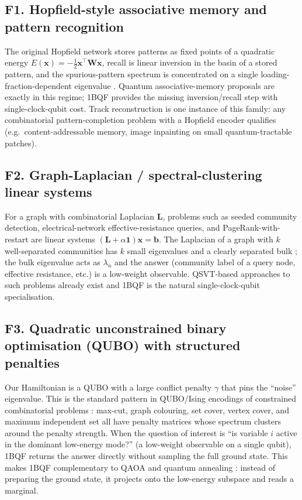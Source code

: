 \documentclass[11pt,a4paper]{article}
\newcommand{\OBQF}{\textsc{1BQF}}
\begin{document}
\subsection*{F1. Hopfield-style associative memory and pattern recognition}
The original Hopfield network \cite{Hopfield:1982} stores patterns as
fixed points of a quadratic energy
$E(\mathbf{x}) = -\tfrac12 \mathbf{x}^\top \mathbf{W}\mathbf{x}$, recall is
linear inversion in the basin of a stored pattern, and the
spurious-pattern spectrum is concentrated on a single
loading-fraction-dependent eigenvalue \cite{Amit:1985}.  Quantum
associative-memory proposals \cite{Ventura:2000,Trugenberger:2001} are
exactly in this regime; \OBQF{} provides the missing
inversion/recall step with single-clock-qubit cost.  Track
reconstruction is one instance of this family: any combinatorial
pattern-completion problem with a Hopfield encoder qualifies (e.g.\
content-addressable memory, image inpainting on small
quantum-tractable patches).

\subsection*{F2. Graph-Laplacian / spectral-clustering linear systems}
For a graph with combinatorial Laplacian $\mathbf{L}$, problems such as
seeded community detection, electrical-network effective-resistance
queries, and PageRank-with-restart are linear systems
$(\mathbf{L} + \alpha\mathbf{1})\mathbf{x} = \mathbf{b}$.  The Laplacian
of a graph with $k$ well-separated communities has $k$ small
eigenvalues and a clearly separated bulk \cite{vonLuxburg:2007}; the
bulk eigenvalue acts as $\lambda_n$ and the answer (community label of
a query node, effective resistance, etc.) is a low-weight observable.
QSVT-based approaches to such problems already exist
\cite{Apers:2022,Childs:2017} and \OBQF{} is the natural
single-clock-qubit specialisation.

\subsection*{F3. Quadratic unconstrained binary optimisation (QUBO)
with structured penalties}
Our Hamiltonian is a QUBO with a large conflict penalty
$\gamma$ that pins the
``noise'' eigenvalue.  This is the standard pattern in
QUBO/Ising encodings of constrained combinatorial problems
\cite{Lucas:2014}: max-cut, graph colouring, set cover, vertex cover,
and maximum independent set all have penalty matrices whose spectrum
clusters around the penalty strength.  When the question of interest is
``is variable $i$ active in the dominant low-energy mode?'' (a
low-weight observable on a single qubit), \OBQF{} returns the answer
directly without sampling the full ground state.  This makes \OBQF{}
complementary to QAOA \cite{Farhi:2014} and quantum annealing
\cite{Kadowaki:1998}: instead of preparing the ground state, it
projects onto the low-energy subspace and reads a marginal.
\end{document}
